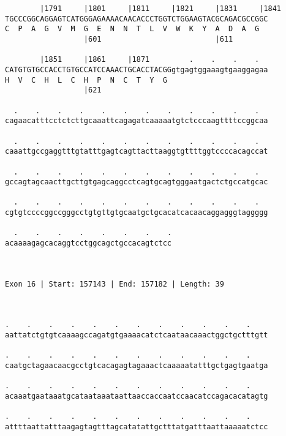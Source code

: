 \documentclass{article}
\begin{document}
\begin{Verbatim}
        |1791     |1801     |1811     |1821     |1831     |1841
TGCCCGGCAGGAGTCATGGGAGAAAACAACACCCTGGTCTGGAAGTACGCAGACGCCGGC
C  P  A  G  V  M  G  E  N  N  T  L  V  W  K  Y  A  D  A  G  
                  |601                          |611        
  
        |1851     |1861     |1871         .    .    .    .  
CATGTGTGCCACCTGTGCCATCCAAACTGCACCTACGGgtgagtggaaagtgaaggagaa
H  V  C  H  L  C  H  P  N  C  T  Y  G                       
                  |621                                      
  
  .    .    .    .    .    .    .    .    .    .    .    .  
cagaacatttcctctcttgcaaattcagagatcaaaaatgtctcccaagttttccggcaa
                                                            
  .    .    .    .    .    .    .    .    .    .    .    .  
caaattgccgaggtttgtatttgagtcagttacttaaggtgttttggtccccacagccat
                                                            
  .    .    .    .    .    .    .    .    .    .    .    .  
gccagtagcaacttgcttgtgagcaggcctcagtgcagtgggaatgactctgccatgcac
                                                            
  .    .    .    .    .    .    .    .    .    .    .    .  
cgtgtccccggccgggcctgtgttgtgcaatgctgcacatcacaacaggagggtaggggg
                                                            
  .    .    .    .    .    .    .    .
acaaaagagcacaggtcctggcagctgccacagtctcc
                                      
                                      
 
Exon 16 | Start: 157143 | End: 157182 | Length: 39



.    .    .    .    .    .    .    .    .    .    .    .    
aattatctgtgtcaaaagccagatgtgaaaacatctcaataacaaactggctgctttgtt
                                                            
.    .    .    .    .    .    .    .    .    .    .    .    
caatgctagaacaacgcctgtcacagagtagaaactcaaaaatatttgctgagtgaatga
                                                            
.    .    .    .    .    .    .    .    .    .    .    .    
acaaatgaataaatgcataataaataattaaccaccaatccaacatccagacacatagtg
                                                            
.    .    .    .    .    .    .    .    .    .    .    .    
attttaattatttaagagtagtttagcatatattgctttatgatttaattaaaaatctcc
                                                            

\end{Verbatim}
\end{document}
